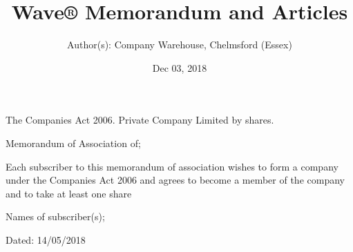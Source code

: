 \documentclass[letterpaper,10pt,english]{sphinxmanual}
\title{Wave® Memorandum and Articles}
\date{Dec 03, 2018}
\author{Author(s): Company Warehouse, Chelmsford (Essex)}
\begin{document}
\maketitle
\sphinxtableofcontents
{}\label{\detokenize{index::doc}}


The Companies Act 2006. Private Company Limited by shares.

Memorandum of Association of; 

Each subscriber to this memorandum of association wishes to form a company under the Companies Act 2006 and agrees to become a member of the company and to take at least one share

Names of subscriber(s); 

Dated: 14/05/2018
\end{document}
